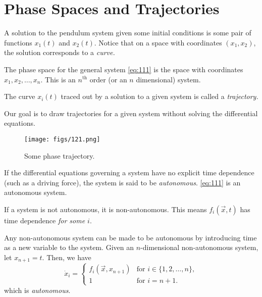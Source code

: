 \documentclass[oneside]{book}
\begin{document}
\section{Phase Spaces and Trajectories}
A solution to the pendulum system given some initial conditions is some pair of functions $ x_1 (t) $ and $ x_2 (t) $. Notice that on a space with coordinates $ (x_1, x_2) $, the solution corresponds to a \textit{curve.}
\begin{definition}
	The phase space for the general system \eqref{eq:111} is the space with coordinates $ x_1, x_2, \ldots, x_n $. This is an $ n^{\text{th}} $ order (or an $n$ dimensional) system.
\end{definition}
\begin{definition}[Trajectory]
	The curve $ x_i (t) $ traced out by a solution to a given system is called a \textit{trajectory.}
\end{definition}
\par
Our goal is to draw trajectories for a given system without solving the differential equations.
\begin{figure}[h!]
\centering
\texttt{[image: figs/121.png]}
\caption{Some phase trajectory.}
\end{figure}
\begin{definition} 
	If the differential equations governing a system have no explicit time dependence (such as a driving force), the system is said to be \textit{autonomous}. \eqref{eq:111} is an autonomous system.
\end{definition}
\begin{definition}
	If a system is not autonomous, it is non-autonomous. This means $ f_i (\vec{x}, t) $ has time dependence \textit{for some $ i $}.
\end{definition}
Any non-autonomous system can be made to be autonomous by introducing time as a new variable to the system. Given an $ n $-dimensional non-autonomous system, let $ x_{n+1} = t $. Then, we have
\[
\dot{x}_i = \begin{cases} f_i (\vec{x}, x_{n+1}) & \text{for } i \in \{1, 2, \ldots, n\}, \\
1 & \text{for } i = n+1.
\end{cases}
\]
which is \textit{autonomous}. \\\\
\end{document}
